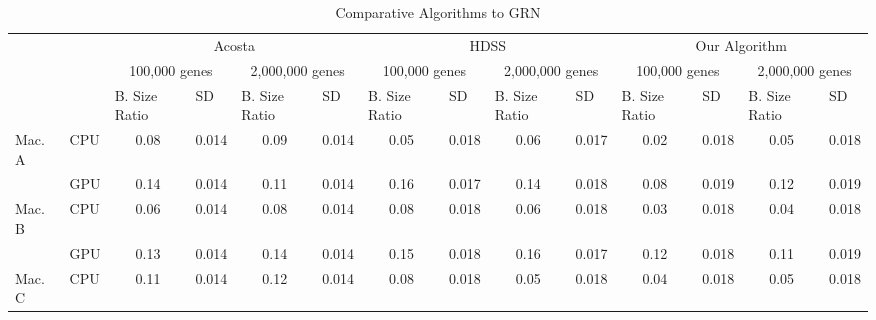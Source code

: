 \documentclass[journal]{IEEEtran}
\begin{document}
\begin{table}[htb]
\centering
\caption{Comparative Algorithms to GRN}
\begin{scriptsize}
\begin{tabular}{|l|l|l|l|l|l|l|l|l|l|l|l|l|l|}
\cline{3-14}
\multicolumn{1}{l}{} &  & \multicolumn{4}{c|}{Acosta} & \multicolumn{4}{c|}{HDSS} & \multicolumn{4}{c|}{Our Algorithm} \\ 
\cline{3-14}
\multicolumn{1}{l}{} &  & \multicolumn{2}{c|}{100,000 genes} & \multicolumn{2}{c|}{2,000,000 genes} & \multicolumn{2}{c|}{100,000 genes} & \multicolumn{2}{c|}{2,000,000 genes} & \multicolumn{2}{c|}{100,000 genes} & \multicolumn{2}{c|}{2,000,000 genes} \\ 
\cline{3-14}
\multicolumn{1}{l}{} &  & B. Size Ratio & SD & B. Size Ratio & SD & B. Size Ratio & SD & B. Size Ratio & SD & B. Size Ratio & SD & B. Size Ratio & SD \\ 
\hline
Mac. A & CPU & \multicolumn{1}{c|}{0.08} & \multicolumn{1}{c|}{0.014} & \multicolumn{1}{c|}{0.09} & \multicolumn{1}{c|}{0.014} & \multicolumn{1}{c|}{0.05} & \multicolumn{1}{c|}{0.018} & \multicolumn{1}{c|}{0.06} & \multicolumn{1}{c|}{0.017} & \multicolumn{1}{c|}{0.02} & \multicolumn{1}{c|}{0.018} & \multicolumn{1}{c|}{0.05} & \multicolumn{1}{c|}{0.018} \\ 
\cline{2-14}
 & GPU & \multicolumn{1}{c|}{0.14} & \multicolumn{1}{c|}{0.014} & \multicolumn{1}{c|}{0.11} & \multicolumn{1}{c|}{0.014} & \multicolumn{1}{c|}{0.16} & \multicolumn{1}{c|}{0.017} & \multicolumn{1}{c|}{0.14} & \multicolumn{1}{c|}{0.018} & \multicolumn{1}{c|}{0.08} & \multicolumn{1}{c|}{0.019} & \multicolumn{1}{c|}{0.12} & \multicolumn{1}{c|}{0.019} \\ 
\hline
Mac. B & CPU & \multicolumn{1}{c|}{0.06} & \multicolumn{1}{c|}{0.014} & \multicolumn{1}{c|}{0.08} & \multicolumn{1}{c|}{0.014} & \multicolumn{1}{c|}{0.08} & \multicolumn{1}{c|}{0.018} & \multicolumn{1}{c|}{0.06} & \multicolumn{1}{c|}{0.018} & \multicolumn{1}{c|}{0.03} & \multicolumn{1}{c|}{0.018} & \multicolumn{1}{c|}{0.04} & \multicolumn{1}{c|}{0.018} \\ 
\cline{2-14}
 & GPU & \multicolumn{1}{c|}{0.13} & \multicolumn{1}{c|}{0.014} & \multicolumn{1}{c|}{0.14} & \multicolumn{1}{c|}{0.014} & \multicolumn{1}{c|}{0.15} & \multicolumn{1}{c|}{0.018} & \multicolumn{1}{c|}{0.16} & \multicolumn{1}{c|}{0.017} & \multicolumn{1}{c|}{0.12} & \multicolumn{1}{c|}{0.018} & \multicolumn{1}{c|}{0.11} & \multicolumn{1}{c|}{0.019} \\ 
\hline
Mac. C & CPU & \multicolumn{1}{c|}{0.11} & \multicolumn{1}{c|}{0.014} & \multicolumn{1}{c|}{0.12} & \multicolumn{1}{c|}{0.014} & \multicolumn{1}{c|}{0.08} & \multicolumn{1}{c|}{0.018} & \multicolumn{1}{c|}{0.05} & \multicolumn{1}{c|}{0.018} & \multicolumn{1}{c|}{0.04} & \multicolumn{1}{c|}{0.018} & \multicolumn{1}{c|}{0.05} & \multicolumn{1}{c|}{0.018} \\ 

\end{tabular}
\end{scriptsize}
\end{table}
\end{document}
